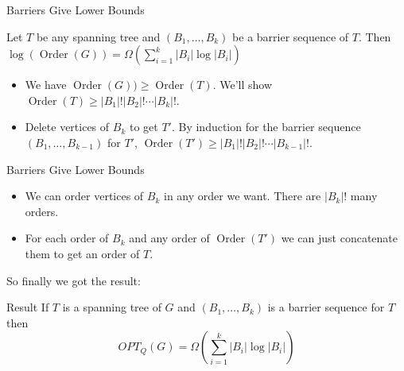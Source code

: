 \documentclass[10pt]{beamer}
\DeclareMathOperator{\order}{Order}
\begin{document}
\begin{frame}{Barriers Give Lower Bounds}
	\begin{theorem}
		Let $T$ be any spanning tree and $(B_1,\dots, B_k)$ be a barrier sequence of $T$. Then $\log(\order(G))=\Omega\left(\sum\limits_{i=1}^k|B_i|\log|B_i|\right)$
	\end{theorem}\vfill \pause

	\begin{itemize}
		\item We have $\order(G))\geq \order(T)$. We'll show $\order(T)\geq |B_1|!|B_2|!\cdots|B_k|!$.\pause \vfill
		\item Delete vertices of $B_k$ to get $T'$. By induction for the barrier sequence $(B_1,\dots, B_{k-1})$ for $T'$, $\order(T')\geq |B_1|!|B_2|!\cdots|B_{k-1}|!$.
	\end{itemize}
\end{frame}

\begin{frame}{Barriers Give Lower Bounds}

	\begin{itemize}
		\item We can order vertices of $B_k$ in any order we want. There are $|B_k|!$ many orders. \pause
		\item For each order of $B_k$ and any order of $\order(T')$ we can just concatenate them to get an order of $T$.\pause
	\end{itemize}
	\vfill

	So finally we got the result:
	\begin{alertblock}{Result}
		If $T$ is a spanning tree of $G$ and $(B_1,\dots, B_k)$ is a barrier sequence for $T$ then $$OPT_Q(G)=\Omega\left(\sum\limits_{i=1}^k|B_i|\log|B_i|\right)$$
	\end{alertblock}
\end{frame}
\end{document}
